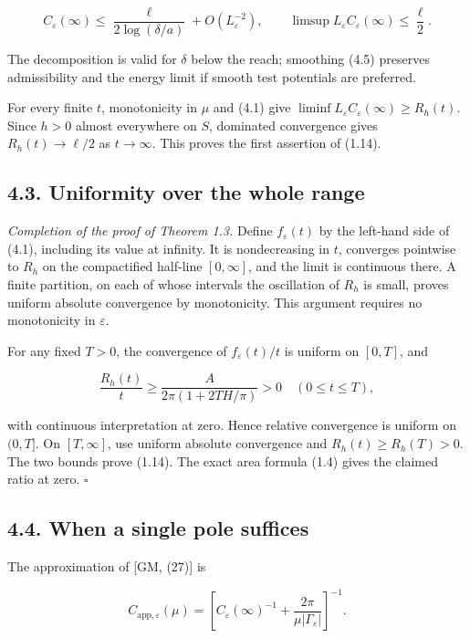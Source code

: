 \documentclass[11pt]{article}
\begin{document}
\[
C_\varepsilon(\infty)
 \le\frac{\ell}{2\log(\delta/a)}+O(L_\varepsilon^{-2}),
\qquad
\limsup L_\varepsilon C_\varepsilon(\infty)\le\frac\ell2.
\tag{4.6}
\]

The decomposition is valid for \(\delta\) below the reach; smoothing
(4.5) preserves admissibility and the energy limit if smooth test
potentials are preferred.

For every finite \(t\), monotonicity in \(\mu\) and (4.1) give
\(\liminf L_\varepsilon C_\varepsilon(\infty)\ge R_h(t)\). Since \(h>0\)
almost everywhere on \(S\), dominated convergence gives
\(R_h(t)\to\ell/2\) as \(t\to\infty\). This proves the first assertion
of (1.14).

\subsection{4.3. Uniformity over the whole
range}\label{uniformity-over-the-whole-range}

\emph{Completion of the proof of Theorem 1.3.} Define
\(f_\varepsilon(t)\) by the left-hand side of (4.1), including its value
at infinity. It is nondecreasing in \(t\), converges pointwise to
\(R_h\) on the compactified half-line \([0,\infty]\), and the limit is
continuous there. A finite partition, on each of whose intervals the
oscillation of \(R_h\) is small, proves uniform absolute convergence by
monotonicity. This argument requires no monotonicity in \(\varepsilon\).

For any fixed \(T>0\), the convergence of \(f_\varepsilon(t)/t\) is
uniform on \([0,T]\), and

\[
\frac{R_h(t)}t\ge\frac{A}{2\pi(1+2TH/\pi)}>0
 \quad(0\le t\le T),
\tag{4.7}
\]

with continuous interpretation at zero. Hence relative convergence is
uniform on \((0,T]\). On \([T,\infty]\), use uniform absolute
convergence and \(R_h(t)\ge R_h(T)>0\). The two bounds prove (1.14). The
exact area formula (1.4) gives the claimed ratio at zero. \(\square\)

\subsection{4.4. When a single pole
suffices}\label{when-a-single-pole-suffices}

The approximation of {[}GM, (27){]} is

\[
C_{\mathrm{app},\varepsilon}(\mu)
 =\left[C_\varepsilon(\infty)^{-1}
              +\frac{2\pi}{\mu|\Gamma_\varepsilon|}\right]^{-1}.
\tag{4.8}
\]
\end{document}
